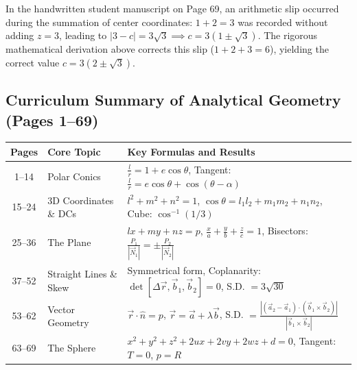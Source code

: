 \begin{notebox}
In the handwritten student manuscript on Page 69, an arithmetic slip occurred during the summation of center coordinates: $1 + 2 = 3$ was recorded without adding $z = 3$, leading to $|3 - c| = 3\sqrt{3} \implies c = 3(1 \pm \sqrt{3})$.
The rigorous mathematical derivation above corrects this slip ($1 + 2 + 3 = 6$), yielding the correct value $c = 3(2 \pm \sqrt{3})$.
\end{notebox}

\subsection{Curriculum Summary of Analytical Geometry (Pages 1--69)}
\begin{center}
\begin{tabular}{|c|l|l|}
\hline
\textbf{Pages} & \textbf{Core Topic} & \textbf{Key Formulas and Results} \\
\hline
1--14 & Polar Conics & $\frac{l}{r} = 1 + e\cos\theta$, Tangent: $\frac{l}{r} = e\cos\theta + \cos(\theta-\alpha)$ \\
15--24 & 3D Coordinates \& DCs & $l^2+m^2+n^2=1$, $\cos\theta = l_1 l_2 + m_1 m_2 + n_1 n_2$, Cube: $\cos^{-1}(1/3)$ \\
25--36 & The Plane & $lx+my+nz=p$, $\frac{x}{a}+\frac{y}{b}+\frac{z}{c}=1$, Bisectors: $\frac{P_1}{|\vec{N}_1|} = \pm\frac{P_2}{|\vec{N}_2|}$ \\
37--52 & Straight Lines \& Skew & Symmetrical form, Coplanarity: $\det[\Delta\vec{r}, \vec{b}_1, \vec{b}_2]=0$, S.D. $= 3\sqrt{30}$ \\
53--62 & Vector Geometry & $\vec{r}\cdot\hat{n}=p$, $\vec{r}=\vec{a}+\lambda\vec{b}$, S.D. $= \frac{|(\vec{a}_2-\vec{a}_1)\cdot(\vec{b}_1\times\vec{b}_2)|}{|\vec{b}_1\times\vec{b}_2|}$ \\
63--69 & The Sphere & $x^2+y^2+z^2+2ux+2vy+2wz+d=0$, Tangent: $T=0$, $p=R$ \\
\hline
\end{tabular}
\end{center}
